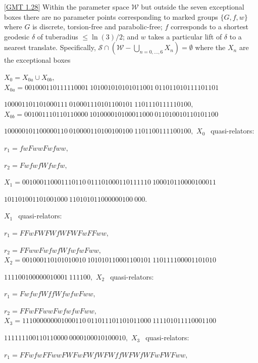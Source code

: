 \begin{theorem}\ref{GMT 1.28}  
Within the parameter space ${\mathcal W}$ but outside the seven exceptional boxes there are no parameter points corresponding to 
marked groups $\{G,f,w\}$ where $G$ is 
discrete{\textrm ,} torsion\/{\textrm -}\/free and  parabolic\/{\textrm -}\/free\/{\textrm ;}
$f$ corresponds to a shortest geodesic $\delta$ of tuberadius $\le
\ln(3)/2${\textrm ;} and $w$ takes a particular lift of $\delta$ to 
a nearest translate.
 Specifically{\textrm ,} 
${\mathcal S} \cap ({\mathcal W} - \bigcup_{n = 0,\dots, 6} X_n)=\emptyset$ where the $X_n$ are the exceptional boxes


 \noindent $X_0 = X_{0a} \cup X_{0b},$
\noindent $X_{0a} = 
001000110111110001\ 
101001010101011001\ 
011011010111101101$\hfill 

 
 \hfill
$100001101101000111\ 
010001110101100101\ 
1101110111110100,$  
 \noindent $X_{0b} = 
001001110110110000\ 
101000010100011000\ 
011010010110101100$

\hfill
$100000101100000110\ 
010000110100100100\ 
1101100111100100,$ 
 \vglue4pt
\noindent  $X_0\ \ $ quasi\/{\textrm -}\/relators\/{\textrm :}

$r_1 = fwFwwFwfww,$
 
$r_2 = FwfwfWfwfw,$

\vglue8pt
\noindent $X_1 = 
001000110001110110\ 
011101000110111110\ 
100010110000100011$\hfill 

\hfill $
101101001101001000\ 
110101011000000100\ 
000.$ 

\noindent $X_1\ \ 
$ quasi\/{\textrm -}\/relators\/{\textrm :}

$r_1 = FFwFWFWfWFWFwFFww,$
 
$r_2 = FFwwFwfwfWfwfwFww,$
\vglue4pt
\noindent $X_2 = 
001000110101010010\ 
101010110001100101\ 
110111100001101010$\hfill

\hfill $111100100000010001\ 
111100,$
\noindent $X_2\ \ $ quasi\/{\textrm -}\/relators\/{\textrm :}

$r_1 = FwfwfWffWfwfwFww,$

$r_2 = FFwFFwwFwfwfwFww,$
\noindent 
$X_3 = 
111000000001000110\ 
011011101101011000\ 
111101011110001100$\hfill

\hfill  
$111111100110110000\ 
0000100010100010,$
\noindent $X_3\ \ $ quasi\/{\textrm -}\/relators\/{\textrm :}\/

$r_1 = FFwfwFFwwFWFwFWfWFWffWFWfWFwFWFww,$ 


\end{theorem}
